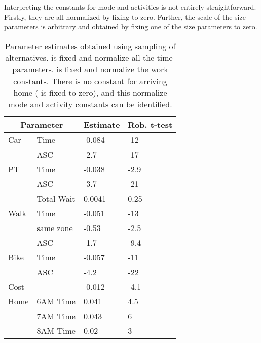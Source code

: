 Interpreting the constants for mode and activities is not entirely straightforward. Firstly, they are all normalized by fixing  to zero. Further, the scale of the size parameters is arbitrary and obtained by fixing one of the size parameters to zero. 

\begin{table}
	\caption{Parameter estimates obtained using sampling of alternatives.  is fixed and normalize all the time-parameters.  is fixed and normalize the work constants. There is no constant for arriving home ( is fixed to zero), and this normalize mode and activity constants can be identified. \label{tab:est1}}
\centering
\begin{tabular}{llll} 
\toprule
 \multicolumn{2}{c}{Parameter} & Estimate  & Rob. t-test       \\
\midrule
            Car &                     Time &     -0.084 &        -12 \\ 
                &                      ASC &       -2.7 &        -17 \\ 
\noalign{\smallskip}
             PT &                     Time &     -0.038 &       -2.9 \\ 
                &                      ASC &       -3.7 &        -21 \\ 
                &               Total Wait &     0.0041 &       0.25 \\ 
\noalign{\smallskip}
           Walk &                     Time &     -0.051 &        -13 \\ 
                &                same zone &      -0.53 &       -2.5 \\ 
                &                      ASC &       -1.7 &       -9.4 \\ 
\noalign{\smallskip}
           Bike &                     Time &     -0.057 &        -11 \\ 
                &                      ASC &       -4.2 &        -22 \\ 
\noalign{\smallskip}
           Cost &                          &     -0.012 &       -4.1 \\ 
\noalign{\smallskip}
           Home &                 6AM Time &      0.041 &        4.5 \\ 
                &                 7AM Time &      0.043 &          6 \\ 
                &                 8AM Time &       0.02 &          3 \\ 

\end{tabular}
\end{table}
